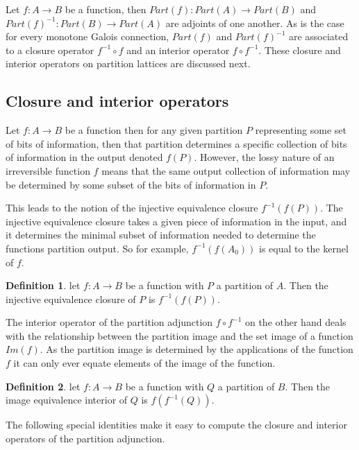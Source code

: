 \documentclass[a4paper,11pt, notitlepage]{report}
\theoremstyle{definition}
\newtheorem{definition}{Definition}[section]
\begin{document}
Let $f: A \to B$ be a function, then $Part(f): Part(A) \to Part(B)$ and $Part(f)^{-1}: Part(B) \to Part(A)$ are adjoints of one another. As is the case for every monotone Galois connection, $Part(f)$ and $Part(f)^{-1}$ are associated to a closure operator $f^{-1} \circ f$ and an interior operator $f \circ f^{-1}$. These closure and interior operators on partition lattices are discussed next.

\newpage

\subsection{Closure and interior operators}

Let $f: A \to B$ be a function then for any given partition $P$ representing some set of bits of information, then that partition determines a specific collection of bits of information in the output denoted $f(P)$. However, the lossy nature of an irreversible function $f$ means that the same output collection of information may be determined by some subset of the bits of information in $P$.

This leads to the notion of the injective equivalence closure $f^{-1}(f(P))$. The injective equivalence closure takes a given piece of information in the input, and it determines the minimal subset of information needed to determine the functions partition output. So for example, $f^{-1}(f(A_0))$ is equal to the kernel of $f$.

\begin{definition}
let $f: A \to B$ be a function with $P$ a partition of $A$. Then the injective equivalence closure of $P$ is $f^{-1}(f(P))$.
\end{definition}

The interior operator of the partition adjunction $f \circ f^{-1}$ on the other hand deals with the relationship between the partition image and the set image of a function $Im(f)$. As the partition image is determined by the applications of the function $f$ it can only ever equate elements of the image of the function.

\begin{definition}
let $f:A \to B$ be a function with $Q$ a partition of $B$. Then the image equivalence interior of $Q$ is $f(f^{-1}(Q))$.
\end{definition}

The following special identities make it easy to compute the closure and interior operators of the partition adjunction.
\end{document}
